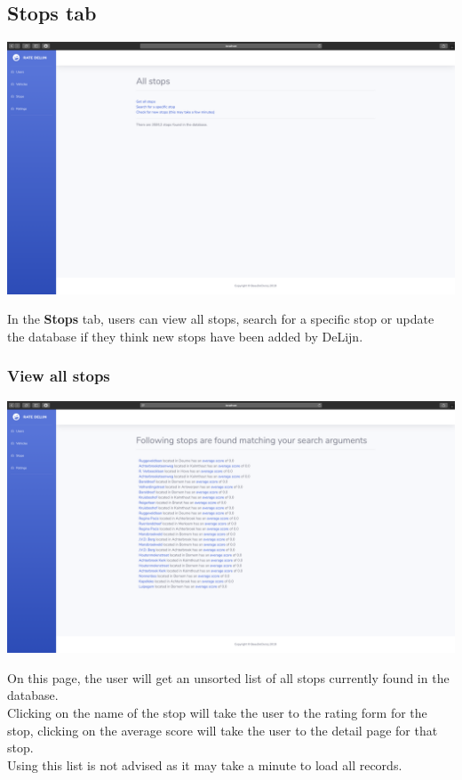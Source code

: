 \documentclass[12pt]{article}
\begin{document}
\subsection{Stops tab}
\begin{center}
	\includegraphics[width=\linewidth]{Images/Stops_tab.png}
\end{center}
In  the \textbf{Stops} tab, users can view all stops, search for a specific stop or update the database if they think new stops have been added by DeLijn.

\subsubsection{View all stops}
\begin{center}
	\includegraphics[width=\linewidth]{Images/All_stops.png}
\end{center}
On this page, the user will get an unsorted list of all stops currently found in the database.\\
Clicking on the name of the stop will take the user to the rating form for the stop, clicking on the average score will take the user to the detail page for that stop.\\
Using this list is not advised as it may take a minute to load all records.
\end{document}

